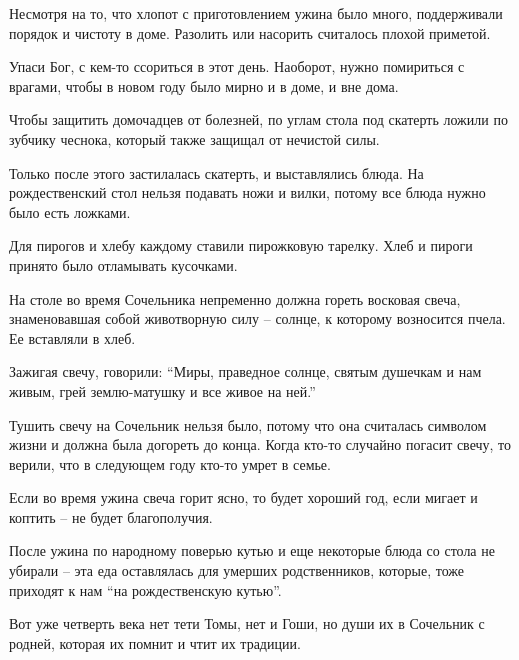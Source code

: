 Несмотря на то, что хлопот с приготовлением ужина было много, поддерживали
порядок и чистоту в доме.  Разолить или насорить считалось плохой приметой.

Упаси Бог, с кем-то ссориться в этот день. Наоборот, нужно помириться с
врагами, чтобы в новом году было мирно и в доме, и вне дома. 

Чтобы защитить домочадцев от болезней, по углам стола под скатерть ложили по
зубчику чеснока, который также защищал от нечистой силы. 

Только после этого застилалась скатерть, и выставлялись блюда. На
рождественский стол нельзя подавать ножи и вилки, потому все блюда нужно было
есть ложками.

Для пирогов и хлебу каждому ставили пирожковую тарелку. Хлеб и пироги принято
было отламывать кусочками.

На столе во время Сочельника непременно должна гореть восковая свеча,
знаменовавшая собой животворную силу – солнце, к которому возносится пчела. Ее
вставляли в хлеб.

Зажигая свечу, говорили: \enquote{Миры, праведное солнце, святым душечкам и нам живым,
грей землю-матушку и все живое на ней.}

Тушить свечу на Сочельник нельзя было, потому что она считалась символом жизни
и должна была догореть до конца. Когда кто-то случайно погасит свечу, то
верили, что в следующем году кто-то умрет в семье. 

Если во время ужина свеча горит ясно, то будет хороший год, если мигает и
коптить – не будет благополучия.

После ужина по народному поверью кутью и еще некоторые блюда со стола не
убирали – эта еда оставлялась для умерших родственников, которые, тоже приходят
к нам \enquote{на рождественскую кутью}. 

Вот уже четверть века нет тети Томы, нет и Гоши, но души их в Сочельник с
родней, которая их помнит и чтит их традиции.

